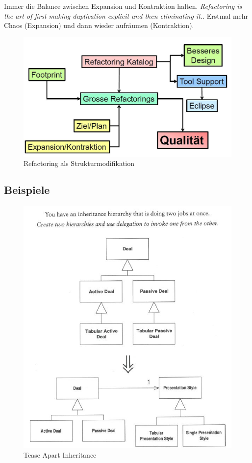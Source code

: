 Immer die Balance zwischen Expansion und Kontraktion halten. \textit{Refactoring is the art of first making duplication explicit and then eliminating it.}. Erstmal mehr Chaos (Expansion) und dann wieder aufräumen (Kontraktion).

\begin{figure}[h!]
\centering
\includegraphics[width=0.7\linewidth]{fig/refactoring-als-strukturmodifikation}
\caption{Refactoring als Strukturmodifikation}
\label{fig:refactoring-als-strukturmodifikation}
\end{figure}

\subsection{Beispiele}

\begin{figure}[h!]
\centering
\includegraphics[width=0.7\linewidth]{fig/tease-apart-inheritance}
\caption{Tease Apart Inheritance}
\label{fig:tease-apart-inheritance}
\end{figure}

